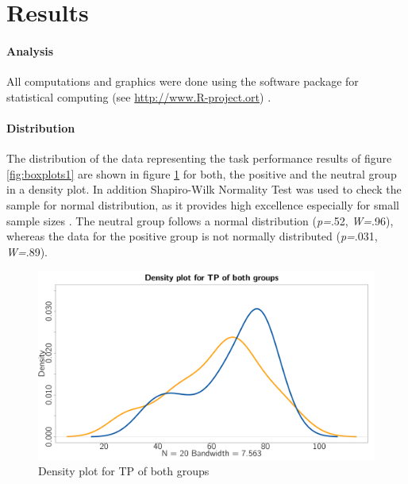 \documentclass[	
	12pt, %
	a4paper, %
  abstracton
]{scrartcl}\usepackage[]{graphicx}\usepackage[]{color}
\newenvironment{knitrout}{}{} %
\begin{document}
\section*{Results}
\paragraph{Analysis}
All computations and graphics were done using the  software package for statistical computing (see \url{http://www.R-project.ort}) \cite{Gandrud2013}.

\paragraph{Distribution}
The distribution of the data representing the task performance results of figure \ref{fig:boxplots1} are shown in figure \ref{fig:density} for both, the positive and the neutral group in a density plot. %
In addition Shapiro-Wilk Normality Test was used to check the sample for normal distribution, as it provides high excellence especially for small sample sizes \cite{Royston1982}. The neutral group follows a normal distribution (\textit{p=}.52, \textit{W=}.96), whereas the data for the positive group is not normally distributed (\textit{p=}.031, \textit{W=}.89).



\begin{knitrout}\footnotesize
{}\color{fgcolor}\begin{figure}[]


{\centering \includegraphics[width=.60\linewidth]{figure/beamer-density} 

}

\caption[Density plot for TP of both groups]{Density plot for TP of both groups\label{fig:density}}
\end{figure}


\end{knitrout}
\end{document}
